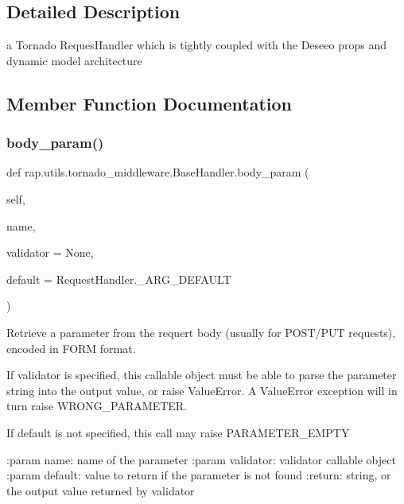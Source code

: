 \subsection{Detailed Description}
\begin{DoxyVerb}a Tornado RequesHandler which is tightly coupled with the Deseeo props and dynamic model architecture\end{DoxyVerb}
 

\subsection{Member Function Documentation}
\mbox{\label{classrap_1_1utils_1_1tornado__middleware_1_1BaseHandler_a76286f218f84bbe922514a47ff260fd3}} 
\subsubsection{\texorpdfstring{body\+\_\+param()}{body\_param()}}
{\footnotesize\ttfamily def rap.\+utils.\+tornado\+\_\+middleware.\+Base\+Handler.\+body\+\_\+param (\begin{DoxyParamCaption}\item[{}]{self,  }\item[{}]{name,  }\item[{}]{validator = {\ttfamily None},  }\item[{}]{default = {\ttfamily RequestHandler.\+\_\+ARG\+\_\+DEFAULT} }\end{DoxyParamCaption})}

\begin{DoxyVerb}Retrieve a parameter from the requert body (usually for POST/PUT requests), encoded in FORM format.

If validator is specified, this callable object must be able to parse the parameter string into
the output value, or raise ValueError. A ValueError exception will in turn raise WRONG_PARAMETER.

If default is not specified, this call may raise PARAMETER_EMPTY

:param name: name of the parameter
:param validator: validator callable object
:param default: value to return if the parameter is not found
:return: string, or the output value returned by validator
\end{DoxyVerb}
 \mbox{\label{classrap_1_1utils_1_1tornado__middleware_1_1BaseHandler_ac0c6d9cbed335d63538233bafce9be22}} 
